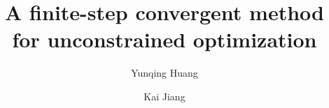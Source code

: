 \documentclass[final,1p,times]{elsarticle}
\begin{document}
\begin{frontmatter}

\title{A finite-step convergent method for unconstrained optimization}




\author[xtu]{Yunqing Huang }


\author[xtu]{Kai Jiang }

\address[xtu]{School of Mathematics and Computational
 Science, 
 \\
Hunan Key Laboratory for Computation and Simulation in Science
and Engineering, Xiangtan University, P.R. China, 411105
 }




\end{frontmatter}
\end{document}

